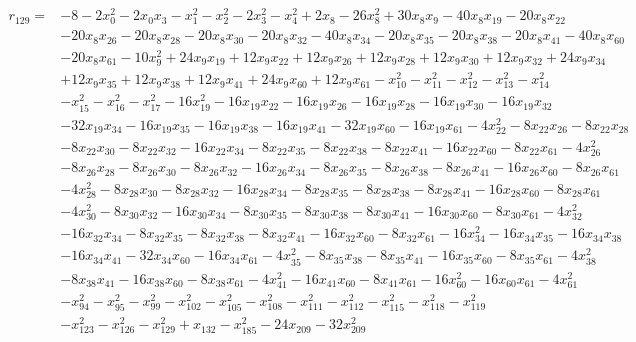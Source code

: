 \begin{align*}
r_{129}={}&-8-2x_{0}^{2}-2x_{0}x_{3}-x_{1}^{2}-x_{2}^{2}-2x_{3}^{2}-x_{4}^{2}+2x_{8}-26x_{8}^{2}+30x_{8}x_{9}-40x_{8}x_{19}-20x_{8}x_{22}\\
&-20x_{8}x_{26}-20x_{8}x_{28}-20x_{8}x_{30}-20x_{8}x_{32}-40x_{8}x_{34}-20x_{8}x_{35}-20x_{8}x_{38}-20x_{8}x_{41}-40x_{8}x_{60}\\
&-20x_{8}x_{61}-10x_{9}^{2}+24x_{9}x_{19}+12x_{9}x_{22}+12x_{9}x_{26}+12x_{9}x_{28}+12x_{9}x_{30}+12x_{9}x_{32}+24x_{9}x_{34}\\
&+12x_{9}x_{35}+12x_{9}x_{38}+12x_{9}x_{41}+24x_{9}x_{60}+12x_{9}x_{61}-x_{10}^{2}-x_{11}^{2}-x_{12}^{2}-x_{13}^{2}-x_{14}^{2}\\
&-x_{15}^{2}-x_{16}^{2}-x_{17}^{2}-16x_{19}^{2}-16x_{19}x_{22}-16x_{19}x_{26}-16x_{19}x_{28}-16x_{19}x_{30}-16x_{19}x_{32}\\
&-32x_{19}x_{34}-16x_{19}x_{35}-16x_{19}x_{38}-16x_{19}x_{41}-32x_{19}x_{60}-16x_{19}x_{61}-4x_{22}^{2}-8x_{22}x_{26}-8x_{22}x_{28}\\
&-8x_{22}x_{30}-8x_{22}x_{32}-16x_{22}x_{34}-8x_{22}x_{35}-8x_{22}x_{38}-8x_{22}x_{41}-16x_{22}x_{60}-8x_{22}x_{61}-4x_{26}^{2}\\
&-8x_{26}x_{28}-8x_{26}x_{30}-8x_{26}x_{32}-16x_{26}x_{34}-8x_{26}x_{35}-8x_{26}x_{38}-8x_{26}x_{41}-16x_{26}x_{60}-8x_{26}x_{61}\\
&-4x_{28}^{2}-8x_{28}x_{30}-8x_{28}x_{32}-16x_{28}x_{34}-8x_{28}x_{35}-8x_{28}x_{38}-8x_{28}x_{41}-16x_{28}x_{60}-8x_{28}x_{61}\\
&-4x_{30}^{2}-8x_{30}x_{32}-16x_{30}x_{34}-8x_{30}x_{35}-8x_{30}x_{38}-8x_{30}x_{41}-16x_{30}x_{60}-8x_{30}x_{61}-4x_{32}^{2}\\
&-16x_{32}x_{34}-8x_{32}x_{35}-8x_{32}x_{38}-8x_{32}x_{41}-16x_{32}x_{60}-8x_{32}x_{61}-16x_{34}^{2}-16x_{34}x_{35}-16x_{34}x_{38}\\
&-16x_{34}x_{41}-32x_{34}x_{60}-16x_{34}x_{61}-4x_{35}^{2}-8x_{35}x_{38}-8x_{35}x_{41}-16x_{35}x_{60}-8x_{35}x_{61}-4x_{38}^{2}\\
&-8x_{38}x_{41}-16x_{38}x_{60}-8x_{38}x_{61}-4x_{41}^{2}-16x_{41}x_{60}-8x_{41}x_{61}-16x_{60}^{2}-16x_{60}x_{61}-4x_{61}^{2}\\
&-x_{94}^{2}-x_{95}^{2}-x_{99}^{2}-x_{102}^{2}-x_{105}^{2}-x_{108}^{2}-x_{111}^{2}-x_{112}^{2}-x_{115}^{2}-x_{118}^{2}-x_{119}^{2}\\
&-x_{123}^{2}-x_{126}^{2}-x_{129}^{2}+x_{132}-x_{185}^{2}-24x_{209}-32x_{209}^{2}
\end{align*}


